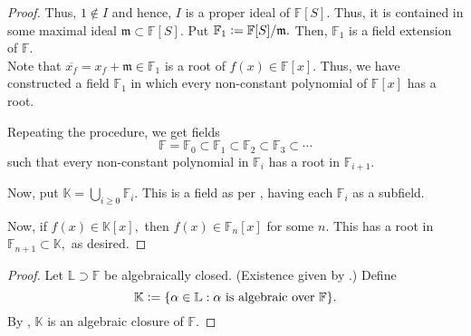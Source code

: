 \begin{proof}
    Thus, $1 \notin I$ and hence, $I$ is a proper ideal of $\mathbb{F}[S].$ Thus, it is contained in some maximal ideal $\mathfrak{m} \subset \mathbb{F}[S].$ Put $\mathbb{F}_1 \vcentcolon= \mathbb{F}[S]/\mathfrak{m}.$ Then, $\mathbb{F}_1$ is a field extension of $\mathbb{F}.$ \\
    Note that $\overline{x_f} = x_f + \mathfrak{m} \in \mathbb{F}_1$ is a root of $f(x) \in \mathbb{F}[x].$ Thus, we have constructed a field $\mathbb{F}_1$ in which every non-constant polynomial of $\mathbb{F}[x]$ has a root.

    Repeating the procedure, we get fields 
    \begin{equation*} 
        \mathbb{F} = \mathbb{F}_0 \subset \mathbb{F}_1 \subset \mathbb{F}_2 \subset \mathbb{F}_3 \subset \cdots
    \end{equation*} 
    such that every non-constant polynomial in $\mathbb{F}_i$ has a root in $\mathbb{F}_{i + 1}.$

    Now, put $\mathbb{K} = \bigcup_{i \ge 0}\mathbb{F}_i.$ This is a field as per , having each $\mathbb{F}_i$ as a subfield. 

    Now, if $f(x) \in \mathbb{K}[x],$ then $f(x) \in \mathbb{F}_n[x]$ for some $n.$ This has a root in $\mathbb{F}_{n + 1} \subset \mathbb{K},$ as desired.
\end{proof}

\algclosure*\label{cor:algclosure2}
\begin{flushright}\hyperref[cor:algclosure]{\upsym}\end{flushright}
\begin{proof}
    Let $\mathbb{L} \supset \mathbb{F}$ be algebraically closed. (Existence given by .) Define
    \begin{equation*} 
        \mathbb{K} \vcentcolon= \{\alpha \in \mathbb{L} : \alpha \text{ is algebraic over } \mathbb{F}\}.
    \end{equation*}
    By , $\mathbb{K}$ is an algebraic closure of $\mathbb{F}.$
\end{proof}

